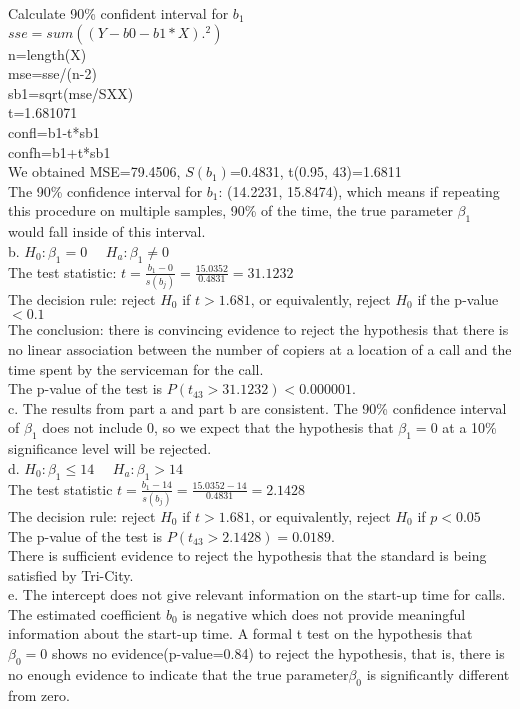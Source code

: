 \documentclass[12pt]{article}
\begin{document}
{Calculate 90\% confident interval for $b_1$\\
$sse=sum((Y-b0-b1*X).^2)$\\
n=length(X)\\
mse=sse/(n-2)\\
sb1=sqrt(mse/SXX)\\
t=1.681071\\
confl=b1-t*sb1\\
confh=b1+t*sb1\\
We obtained MSE=79.4506, $S(b_1)$=0.4831, t(0.95, 43)=1.6811\\
The 90\% confidence interval for $b_1$: (14.2231, 15.8474), which means  if repeating this procedure on multiple samples, 90\% of the time, the true parameter $\beta_1$  would fall inside of this interval. \\
b. $H_0: \beta_1=0$~ ~$H_a:\beta_1\ne0$\\
The test statistic: $t=\frac{b_1-0}{s(b_j)}=\frac{15.0352}{0.4831}=31.1232$\\
The decision rule: reject $H_0$ if $t>1.681$, or equivalently, reject $H_0$ if the p-value$<0.1$\\
The conclusion: there is convincing evidence to reject the hypothesis that there is no linear association between the number of  copiers at a location of a call and the time spent by the serviceman for the call. \\
The p-value of the test is $P(t_{43}>31.1232)<0.000001.$\\
c. The results from part a and part b are consistent. The 90\% confidence interval of $\beta_1$ does not include 0, so we expect that the hypothesis that $\beta_1=0$ at a 10\% significance level will be rejected. \\
d. $H_0: \beta_1\leq14$~ ~$H_a:\beta_1>14$\\
The test statistic $t=\frac{b_1-14}{s(b_j)}=\frac{15.0352-14}{0.4831}=2.1428$\\
The decision rule: reject $H_0$ if $t>1.681$, or equivalently, reject $H_0$ if $p<0.05$\\
The p-value of the test is $P(t_{43}>2.1428)=0.0189.$\\
There is sufficient evidence to reject the hypothesis that the standard is being satisfied by Tri-City. \\
e. The intercept does not give relevant information on the start-up time for calls. The estimated coefficient $b_0$ is negative which does not provide meaningful information about the start-up time.
A formal  t test on the hypothesis that $\beta_0=0$ shows no evidence(p-value=0.84) to reject the hypothesis, that is, there is no enough evidence to indicate that the true parameter$\beta_0$ is significantly different from zero. 
}
\end{document}
